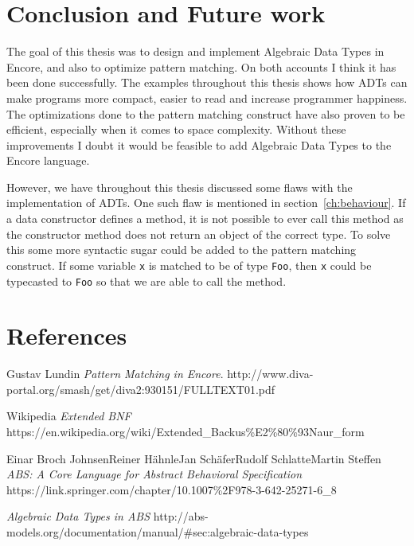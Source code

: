 \documentclass[10pt]{report}
\def\code#1{\texttt{#1}} %
\begin{document}
{\chapter{Conclusion and Future work}
\par{The goal of this thesis was to design and implement Algebraic Data Types in Encore, and also to optimize pattern matching. On both accounts I think it has been done successfully. The examples throughout this thesis shows how ADTs can make programs more compact, easier to read and increase programmer happiness\cite{happy}. The optimizations done to the pattern matching construct have also proven to be efficient, especially when it comes to space complexity. Without these improvements I doubt it would be feasible to add Algebraic Data Types to the Encore language.}
\par{However, we have throughout this thesis discussed some flaws with the implementation of ADTs. One such flaw is mentioned in section~\ref{ch:behaviour}. If a data constructor defines a method, it is not possible to ever call this method as the constructor method does not return an object of the correct type. To solve this some more syntactic sugar could be added to the pattern matching construct. If some variable \code{x} is matched to be of type \code{Foo}, then \code{x} could be typecasted to \code{Foo} so that we are able to call the method.}

\chapter{References}


\begin{thebibliography}{9}
Gustav Lundin
\textit{Pattern Matching in Encore}.
http://www.diva-portal.org/smash/get/diva2:930151/FULLTEXT01.pdf

Wikipedia
\textit{Extended BNF}
https://en.wikipedia.org/wiki/Extended\_Backus\%E2\%80\%93Naur\_form

Einar Broch JohnsenReiner HähnleJan SchäferRudolf SchlatteMartin Steffen
\textit{ABS: A Core Language for Abstract Behavioral Specification}
https://link.springer.com/chapter/10.1007\%2F978-3-642-25271-6\_8

\textit{Algebraic Data Types in ABS}
http://abs-models.org/documentation/manual/\#sec:algebraic-data-types


\end{thebibliography}}
\end{document}
